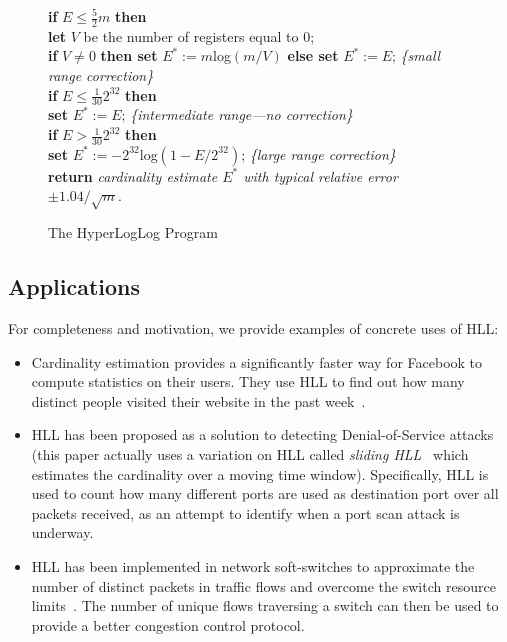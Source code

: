 \documentclass[11pt]{article}
\begin{document}
\begin{figure}[ht]
{\begin{minipage}{40em}
\begin{flushleft}
\textbf{if} $E \le \frac{5}{2}m$ \textbf{then}\\
    \hspace{2em}  \textbf{let} $V$ be the number of registers equal to $0$;\\
    \hspace{2em}  \textbf{if} $V \neq 0$ \textbf{then set} $E^*:= m $log$(m/V)$ \textbf{else set} $E^*:= E$; \hfill \textit{\{small range correction\}}\\
\textbf{if} $E \le \frac{1}{30}2^{32}$ \textbf{then}\\
    \hspace{2em} \textbf{set} $E^*:= E$; \hfill \textit{\{intermediate range—no correction\}}\\
\textbf{if} $E > \frac{1}{30}2^{32}$ \textbf{then}\\
    \hspace{2em}  \textbf{set} $E^*:= -2^{32}$log$(1 - E/2^{32})$; \hfill \textit{\{large range correction\}}\\
\textbf{return} \textit{cardinality estimate $E^*$ with typical relative error} $\pm1.04/\sqrt{m}$.
\end{flushleft}
\end{minipage}
}
\caption{The HyperLogLog Program}
\label{fig:hll}
\end{figure}

\subsection{Applications}
For completeness and motivation, we provide examples of concrete uses of HLL:
\begin{itemize}
    \item Cardinality estimation provides a significantly faster way for Facebook to compute statistics on their users. They use HLL to find out how many distinct people visited their website in the past week~\cite{fbhll}.
    \item HLL has been proposed as a solution to detecting Denial-of-Service attacks~\cite{portscanhll} (this paper actually uses a variation on HLL called \emph{sliding HLL}~\cite{slidinghll} which estimates the cardinality over a moving time window). Specifically, HLL is used to count how many different ports are used as destination port over all packets received, as an attempt to identify when a port scan attack is underway.
    \item HLL has been implemented in network soft-switches to approximate the number of distinct packets in traffic flows and overcome the switch resource limits~\cite{flexswitch}. The number of unique flows traversing a switch can then be used to provide a better congestion control protocol.
\end{itemize}
\end{document}
